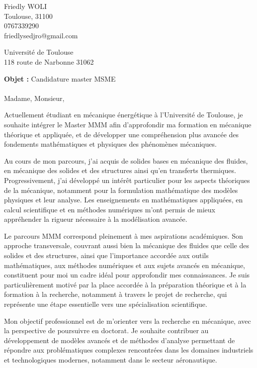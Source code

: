 \documentclass[11pt,a4paper]{article}
\begin{document}
	\pagestyle{empty}
	
	\noindent
	Friedly WOLI \\  %
	Toulouse, 31100  \\
	0767339290 \\
	friedlysedjro@gmail.com 
	
	\begin{flushright}
		
		Université de Toulouse \\
		118 route de Narbonne 31062 
	\end{flushright}
	
	
	\bigskip
	
	
	
	
	
	
	\textbf{Objet :} Candidature master MSME \\ \\
Madame, Monsieur,

Actuellement étudiant en mécanique énergétique à l’Université de Toulouse, je souhaite intégrer le Master MMM afin d’approfondir ma formation en mécanique théorique et appliquée, et de développer une compréhension plus avancée des fondements mathématiques et physiques des phénomènes mécaniques.

Au cours de mon parcours, j’ai acquis de solides bases en mécanique des fluides, en mécanique des solides et des structures ainsi qu’en transferts thermiques. Progressivement, j’ai développé un intérêt particulier pour les aspects théoriques de la mécanique, notamment pour la formulation mathématique des modèles physiques et leur analyse. Les enseignements en mathématiques appliquées, en calcul scientifique et en méthodes numériques m’ont permis de mieux appréhender la rigueur nécessaire à la modélisation avancée.

Le parcours MMM correspond pleinement à mes aspirations académiques. Son approche transversale, couvrant aussi bien la mécanique des fluides que celle des solides et des structures, ainsi que l’importance accordée aux outils mathématiques, aux méthodes numériques et aux sujets avancés en mécanique, constituent pour moi un cadre idéal pour approfondir mes connaissances. Je suis particulièrement motivé par la place accordée à la préparation théorique et à la formation à la recherche, notamment à travers le projet de recherche, qui représente une étape essentielle vers une spécialisation scientifique.

Mon objectif professionnel est de m’orienter vers la recherche en mécanique, avec la perspective de poursuivre en doctorat. Je souhaite contribuer au développement de modèles avancés et de méthodes d’analyse permettant de répondre aux problématiques complexes rencontrées dans les domaines industriels et technologiques modernes, notamment dans le secteur aéronautique.
\end{document}
